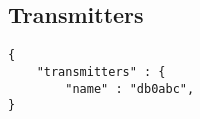 \documentclass[a4paper]{article}
\begin{document}
\subsection{Transmitters}
\begin{lstlisting}
{
    "transmitters" : {
        "name" : "db0abc",
}
\end{lstlisting}
%
%
%
%
%
%
%
%
%
\end{document}

